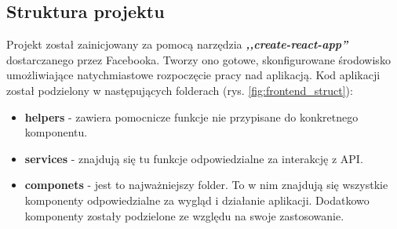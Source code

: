 \documentclass[declaration,shortabstract]{iithesis}
\begin{document}
\subsection{Struktura projektu}
Projekt został zainicjowany za pomocą narzędzia \textbf{\textit{,,create-react-app''}} dostarczanego przez Facebooka. Tworzy ono gotowe, skonfigurowane środowisko umożliwiające natychmiastowe rozpoczęcie pracy nad aplikacją. Kod aplikacji został podzielony w następujących folderach (rys. \ref{fig:frontend_struct}): 
\begin{itemize}
    \item \textbf{\textunderscore helpers} - zawiera pomocnicze funkcje nie przypisane do konkretnego komponentu.
    \item \textbf{\textunderscore services} - znajdują się tu funkcje odpowiedzialne za interakcję z API.
    \item \textbf{componets} - jest to najważniejszy folder. To w nim znajdują się wszystkie komponenty odpowiedzialne za wygląd i działanie aplikacji. Dodatkowo komponenty zostały podzielone ze względu na swoje zastosowanie.
\end{itemize}
\end{document}
